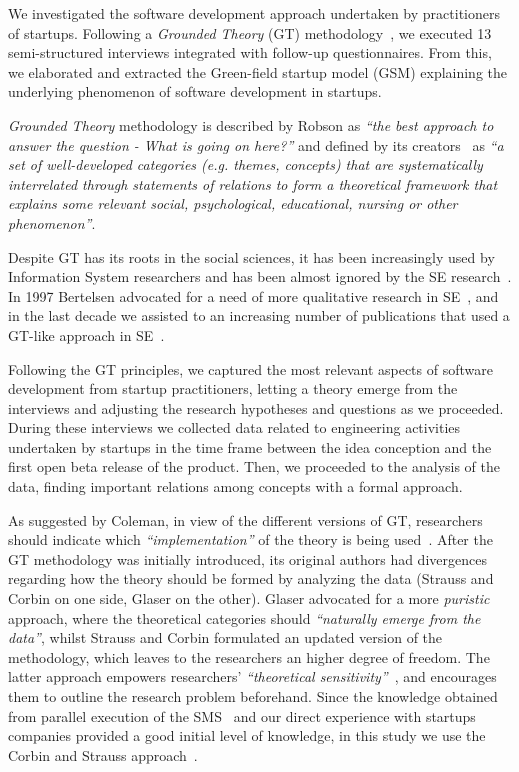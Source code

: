 \documentclass[10pt,journal,letterpaper,compsoc]{IEEEtran}
\begin{document}
We investigated the software development approach undertaken by practitioners
of startups. Following a \textit{Grounded Theory} (GT) 
methodology~\cite{Glaser1978}, we executed 13 semi-structured interviews 
integrated with follow-up questionnaires. From this, we elaborated and 
extracted the Green-field startup model (GSM) explaining the underlying 
phenomenon of software development in startups.

\textit{Grounded Theory} methodology is described by Robson as \textit{``the
best approach to answer the question - What is going on here?''} and defined by
its creators~\cite{ColinRobson2009} as \textit{``a set of well-developed
categories (e.g. themes, concepts) that are systematically interrelated
through statements of relations to form a theoretical framework that explains
some relevant social, psychological, educational, nursing or other
phenomenon''}.

Despite GT has its roots in the social sciences, it has been increasingly used
by Information System researchers and has been almost ignored by the SE 
research~\cite{Coleman2007}. In 1997 Bertelsen advocated for a need of more 
qualitative research in SE~\cite{Bertelsen1997}, and in the last decade we 
assisted to an increasing number of publications that used a GT-like approach 
in SE~\cite{Coleman2008a,Coleman2007, Sulayman2012}.

Following the GT principles, we captured the most relevant aspects of software 
development from startup practitioners, letting a theory emerge from the 
interviews and adjusting the research hypotheses and questions as we
proceeded. During these interviews we collected data related to
engineering activities undertaken by startups in the time frame between the idea
conception and the first open beta release of the product. Then, we proceeded
to the analysis of the data, finding important relations among concepts with a
formal approach.

As suggested by Coleman, in view of the different versions of GT, researchers 
should indicate which \textit{``implementation''} of the theory is being 
used~\cite{Coleman2007}. After the GT methodology was initially introduced, its 
original authors had divergences regarding how the theory should be formed by 
analyzing the data (Strauss and Corbin on one side, Glaser on the other). 
Glaser advocated for a more \textit{puristic} approach, where the theoretical 
categories should \textit{``naturally emerge from the data''}, whilst Strauss 
and Corbin formulated an updated version of the methodology, which leaves to 
the researchers an higher degree of freedom. The latter approach empowers 
researchers' \textit{``theoretical sensitivity''}~\cite{Corbin1990}, and 
encourages them to outline the research problem beforehand. Since the knowledge 
obtained from parallel execution of the SMS~\cite{SMS} and our direct experience 
with startups companies provided a good
initial level of knowledge, in this study we use the Corbin and Strauss
approach~\cite{Strauss1998}.
\end{document}
